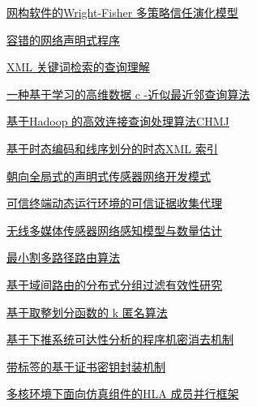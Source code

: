 \documentclass[a4paper]{article}
\begin{document}
\href{http://www.jos.org.cn/ch/reader/download_pdf.aspx?file_no=4155&year_id=2012&quarter_id=8&falg=1}{网构软件的Wright-Fisher 多策略信任演化模型}

\href{http://www.jos.org.cn/ch/reader/download_pdf.aspx?file_no=4168&year_id=2012&quarter_id=8&falg=1}{容错的网络声明式程序}

\href{http://www.jos.org.cn/ch/reader/download_pdf.aspx?file_no=4122&year_id=2012&quarter_id=8&falg=1}{XML 关键词检索的查询理解}

\href{http://www.jos.org.cn/ch/reader/download_pdf.aspx?file_no=4166&year_id=2012&quarter_id=8&falg=1}{一种基于学习的高维数据 c -近似最近邻查询算法}

\href{http://www.jos.org.cn/ch/reader/download_pdf.aspx?file_no=4124&year_id=2012&quarter_id=8&falg=1}{基于Hadoop 的高效连接查询处理算法CHMJ}

\href{http://www.jos.org.cn/ch/reader/download_pdf.aspx?file_no=4161&year_id=2012&quarter_id=8&falg=1}{基于时态编码和线序划分的时态XML 索引}

\href{http://www.jos.org.cn/ch/reader/download_pdf.aspx?file_no=4109&year_id=2012&quarter_id=8&falg=1}{朝向全局式的声明式传感器网络开发模式}

\href{http://www.jos.org.cn/ch/reader/download_pdf.aspx?file_no=4115&year_id=2012&quarter_id=8&falg=1}{可信终端动态运行环境的可信证据收集代理}

\href{http://www.jos.org.cn/ch/reader/download_pdf.aspx?file_no=4159&year_id=2012&quarter_id=8&falg=1}{无线多媒体传感器网络感知模型与数量估计}

\href{http://www.jos.org.cn/ch/reader/download_pdf.aspx?file_no=4133&year_id=2012&quarter_id=8&falg=1}{最小割多路径路由算法}

\href{http://www.jos.org.cn/ch/reader/download_pdf.aspx?file_no=4134&year_id=2012&quarter_id=8&falg=1}{基于域间路由的分布式分组过滤有效性研究}

\href{http://www.jos.org.cn/ch/reader/download_pdf.aspx?file_no=4157&year_id=2012&quarter_id=8&falg=1}{基于取整划分函数的 k 匿名算法}

\href{http://www.jos.org.cn/ch/reader/download_pdf.aspx?file_no=4117&year_id=2012&quarter_id=8&falg=1}{基于下推系统可达性分析的程序机密消去机制}

\href{http://www.jos.org.cn/ch/reader/download_pdf.aspx?file_no=4127&year_id=2012&quarter_id=8&falg=1}{带标签的基于证书密钥封装机制}

\href{http://www.jos.org.cn/ch/reader/download_pdf.aspx?file_no=4113&year_id=2012&quarter_id=8&falg=1}{多核环境下面向仿真组件的HLA 成员并行框架}
\end{document}
